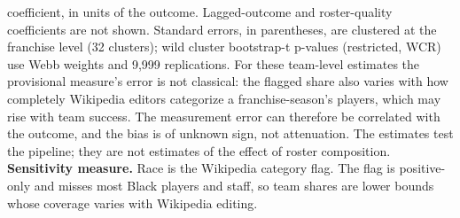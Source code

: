 \begin{table}[!h]
{\begin{threeparttable}
\begin{tablenotes}[para]
coefficient, in units of the outcome. Lagged-outcome and roster-quality coefficients are not shown. Standard errors, in parentheses, are clustered at the franchise level (32 clusters); wild cluster bootstrap-t p-values (restricted, WCR) use Webb weights and 9,999 replications. For these team-level estimates the provisional measure's error is not classical: the flagged share also varies with how completely Wikipedia editors categorize a franchise-season's players, which may rise with team success. The measurement error can therefore be correlated with the outcome, and the bias is of unknown sign, not attenuation. The estimates test the pipeline; they are not estimates of the effect of roster composition. \textbf{Sensitivity measure.} Race is the Wikipedia category flag. The flag is positive-only and misses most Black players and staff, so team shares are lower bounds whose coverage varies with Wikipedia editing.
\end{tablenotes}
\end{threeparttable}}
\end{table}
